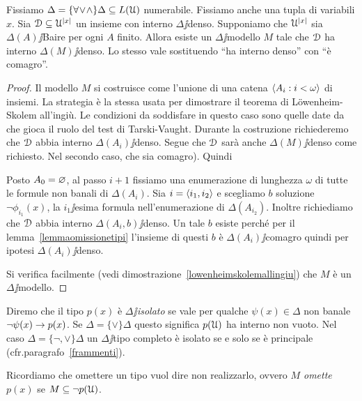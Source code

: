\begin{theorem}\label{omissionetipitopologica}
Fissiamo $\Delta=\{\forall\!\vee\!\wedge\}\Delta\subseteq L(\EuScript U)$ numerabile. Fissiamo anche una tupla di variabili $x$. Sia $\EuScript D\subseteq\EuScript U^{|x|}$ un insieme con interno $\Delta\jj$denso. Supponiamo che $\EuScript U^{|x|}$ sia $\Delta(A)\jj$Baire per ogni $A$ finito. Allora esiste un $\Delta\jj$modello $M$ tale che $\EuScript D$ ha interno $\Delta(M)\jj$denso. Lo stesso vale sostituendo ``ha interno denso'' con ``\`e comagro''.
\end{theorem}
\begin{proof} 
Il modello $M$ si costruisce come l'unione di una catena $\langle A_i: i<\omega\rangle$ di insiemi. La strategia \`e la stessa usata per dimostrare il teorema di L\"owenheim-Skolem all'ingi\`u. Le condizioni da soddisfare in questo caso sono quelle date da  che gioca il ruolo del test di Tarski-Vaught. Durante la costruzione richiederemo che $\EuScript D$ abbia interno $\Delta(A_i)\jj$denso. Segue che $\EuScript D$ sar\`a anche $\Delta(M)\jj$denso come richiesto. Nel secondo caso, che sia comagro). Quindi

Posto $A_0=\varnothing$, al passo $i+1$ fissiamo una enumerazione di lunghezza $\omega$ di tutte le formule non banali di $\Delta(A_i)$.  Sia $i=\langle i_1,i_2\rangle$ e scegliamo $b$ soluzione $\neg\phi_{i_1}(x)$, la $i_1\jj$esima formula nell'enumerazione di $\Delta(A_{i_2})$. Inoltre richiediamo che $\EuScript D$ abbia interno $\Delta(A_i,b)\jj$denso. Un tale $b$ esiste perch\'e per il lemma~\ref{lemmaomissionetipi} l'insieme di questi $b$ \`e $\Delta(A_i)\jj$comagro quindi per ipotesi $\Delta(A_i)\jj$denso.

Si verifica facilmente (vedi dimostrazione~\ref{lowenheimskolemallingiu}) che $M$ \`e un $\Delta\jj$modello.
%
\end{proof}

\begin{definition}
Diremo che il tipo $p(x)$ \`e \emph{$\Delta\jj$isolato\/} se vale per qualche $\psi(x)\in\Delta$ non banale $\neg\psi(x)\rightarrow p(x)$. Se $\Delta=\{\vee\}\Delta$ questo significa $p(\EuScript U)$ ha interno non vuoto.  Nel caso $\Delta=\{\neg,\vee\}\Delta$ un $\Delta\jj$tipo completo \`e isolato se e solo se \`e principale (cfr.\@ paragrafo~\ref{frammenti}).\QED
\end{definition}

Ricordiamo che omettere un tipo vuol dire non realizzarlo, ovvero \emph{$M$ omette $p(x)$\/} se $M\subseteq \neg p(\EuScript U)$.

